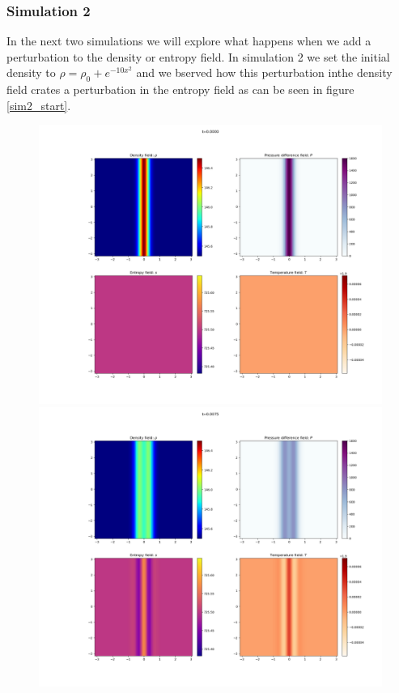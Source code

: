 \documentclass{article}
\begin{document}
\subsubsection{Simulation 2}
In the next two simulations we will explore what happens when we add a perturbation to the density or entropy field.
In simulation 2 we set the initial density to \(\rho = \rho_0 + e^{-10x^2}\) and we bserved how this perturbation inthe density field crates a perturbation in the entropy field as can be seen in figure \ref{sim2_start}.

\begin{figure}[h]
    \includegraphics[width=\textwidth/3]{Sim 2/SF02_0000.png}
    \includegraphics[width=\textwidth/3]{Sim 2/SF02_0003.png}

\end{figure}
\end{document}
